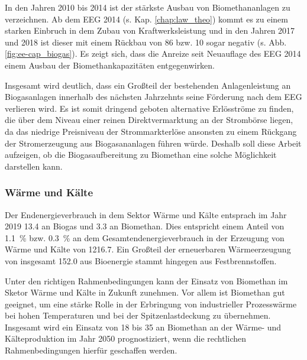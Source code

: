 

In den Jahren \SI{2010}{\relax} bis \SI{2014}{\relax} ist der stärkste Ausbau von Biomethananlagen zu verzeichnen. Ab dem \gls{EEG} \SI{2014}{\relax} (s. Kap. \ref{chap:law_theo}) kommt es zu einem starken Einbruch in dem Zubau von Kraftwerksleistung und in den Jahren \SI{2017}{\relax} und \SI{2018}{\relax} ist dieser mit einem Rückbau von \SI{86}{\mw} bzw. \SI{10}{\mw} sogar negativ (s. Abb. \ref{fig:ee-cap_biogas}). Es zeigt sich, dass die Anreize seit Neuauflage des \gls{EEG} \SI{2014}{\relax} einem Ausbau der Biomethankapazitäten entgegenwirken. \parencite{BWE2020} \smallskip

Insgesamt wird deutlich, dass ein Großteil der bestehenden Anlagenleistung an Biogasanlagen innerhalb des nächsten Jahrzehnts seine Förderung nach dem \gls{EEG} verlieren wird. Es ist somit dringend geboten alternative Erlösströme zu finden, die über dem Niveau einer reinen Direktvermarktung an der Strombörse liegen, da das niedrige Preisniveau der Strommarkterlöse ansonsten zu einem Rückgang der Stromerzeugung aus Biogasananlagen führen würde. Deshalb soll diese Arbeit aufzeigen, ob die Biogasaufbereitung zu Biomethan eine solche Möglichkeit darstellen kann.


\subsubsection{Wärme und Kälte}

Der Endenergieverbrauch in dem Sektor Wärme und Kälte entsprach im Jahr 2019 \SI{13.4}{\twh} an Biogas und \SI{3.3}{\twh} an Biomethan. Dies entspricht einem Anteil von \SI{1.1}{\percent} bzw. \SI{0.3}{\percent} an dem Gesamtendenergieverbrauch in der Erzeugung von Wärme und Kälte von \SI{1216.7}{\twh}. Ein Großteil der erneuerbaren Wärmeerzeugung von insgesamt \SI{152.0}{\twh} aus Bioenergie stammt hingegen aus Festbrennstoffen. \parencite{BWE2020}\smallskip

Unter den richtigen Rahmenbedingungen kann der Einsatz von Biomethan im Sketor Wärme und Kälte in Zukunft zunehmen. Vor allem ist Biomethan gut geeignet, um eine stärke Rolle in der Erbringung von industrieller Prozesswärme bei hohen Temperaturen und bei der Spitzenlastdeckung zu übernehmen. Insgesamt wird ein Einsatz von \SI{18}{\twh} bis \SI{35}{\twh} an Biomethan an der Wärme- und Kälteproduktion im Jahr 2050 prognostiziert, wenn die rechtlichen Rahmenbedingungen hierfür geschaffen werden. \parencite{dena2017}



